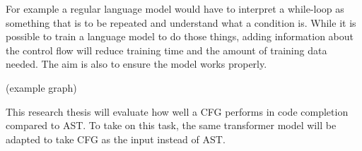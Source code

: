 For example a regular language model would have to interpret a while-loop as something that is to be repeated and understand what a condition is. While it is possible to train a language model to do those things, adding information about the control flow will reduce training time and the amount of training data needed. The aim is also to ensure the model works properly.

(example graph)

This research thesis will evaluate how well a CFG performs in code completion compared to AST. To take on this task, the same transformer model will be adapted to take CFG as the input instead of AST.
